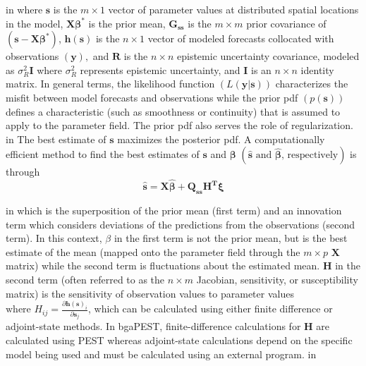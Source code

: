 \documentclass[11pt,oneside,onecolumn]{usgsreport}
\begin{document}
\begin{appendix}
 in
where \textbf{$\mathbf{s}$ }is the $m\times1$ vector of parameter
values at distributed spatial locations in the model, $\mathbf{X\beta^{*}}$
is the prior mean, $\mathbf{G_{ss}}$ is the $m\times m$ prior covariance
of $\left(\mathbf{s}-\mathbf{X\beta^{*}}\right)$, $\mathbf{h\left(\mathbf{s}\right)}$
is the $n\times1$ vector of modeled forecasts collocated with observations
$\left(\mathbf{y}\right),$ and \textbf{$\mathbf{R}$ }is the $n\times n$
epistemic uncertainty covariance, modeled as $\sigma_{R}^{2}\mathbf{I}$
where $\sigma_{R}^{2}$ represents epistemic uncertainty, and $\mathbf{I}$
is an $n\times n$ identity matrix. In general terms, the likelihood
function $\left(L\left(\mathbf{y}|\mathbf{s}\right)\right)$ characterizes
the misfit between model forecasts and observations while the prior
pdf $\left(p\left(\mathbf{s}\right)\right)$ defines a characteristic
(such as smoothness or continuity) that is assumed to apply to the
parameter field. The prior pdf also serves the role of regularization. 
 in
The best estimate of $\mathbf{s}$ maximizes the posterior pdf. A
computationally efficient method to find the best estimates of $\mathbf{s}$
and $\mathbf{\beta}$ $\left(\hat{\mathbf{s}}\mbox{ and }\mathbf{\hat{\beta}}\mbox{, respectively}\right)$
is through
\begin{equation}
\hat{\mathbf{s}}=\mathbf{X\hat{\beta}+Q_{ss}H^{\mathbf{T}}\xi}\label{eq:bestest}
\end{equation}

 in
which is the superposition of the prior mean (first term) and an innovation
term which considers deviations of the predictions from the observations
(second term). In this context, $\beta$ in the first term is not
the prior mean, but is the best estimate of the mean (mapped onto
the parameter field through the $m\times p$ $\mathbf{X}$ matrix)
while the second term is fluctuations about the estimated mean. $\mathbf{H}$
in the second term (often referred to as the $n\times m$ Jacobian,
sensitivity, or susceptibility matrix) is the sensitivity of observation
values to parameter values $\mbox{where }H_{ij}=\frac{\partial\mathbf{h}\left(\mathbf{s}\right)_{i}}{\partial\mathbf{s}_{j}}$,
which can be calculated using either finite difference or adjoint-state
methods. In bgaPEST, finite-difference calculations for $\mathbf{H}$
are calculated using PEST whereas adjoint-state calculations depend
on the specific model being used and must be calculated using an external
program.
 in


\end{appendix}
\end{document}

